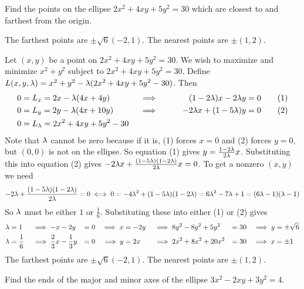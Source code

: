 \begin{question}[M200 2004A] %
Find the points on the ellipse $2x^2 + 4xy + 5y^2 = 30$ which are closest 
to and farthest from the origin.
\end{question}

%

\begin{answer}
The farthest points are $\pm\sqrt{6}(-2,1)$.
The nearest points are $\pm(1,2)$.
\end{answer}

\begin{solution}
Let $(x,y)$ be a point on $2x^2 + 4xy + 5y^2 = 30$. 
We wish to maximize and minimize $x^2+y^2$ subject to $2x^2 + 4xy + 5y^2 = 30$. 
Define $L(x,y,\lambda)=x^2+y^2-\lambda(2x^2 + 4xy + 5y^2 - 30)$. Then
\begin{alignat*}{5}
0&=L_x=2x-\lambda (4x+4y)\qquad&&\implies\qquad &(1-2\lambda)x-2\lambda y&=0\tag{1} \\
0&=L_y=2y-\lambda (4x+10y)\qquad&&\implies& -2\lambda x+(1-5\lambda)y&=0\tag{2} \\
0&=L_\lambda=2x^2 + 4xy + 5y^2 - 30
\end{alignat*}
 Note that
$\lambda$ cannot be zero because if it is, (1) forces $x=0$ and (2) forces
$y=0$, but $(0,0)$ is not on the ellipse. So equation (1) 
gives $y=\frac{1-2\lambda}{2\lambda}x$. Substituting this into
equation (2) gives $-2\lambda x+\frac{(1-5\lambda)(1-2\lambda)}{2\lambda}x=0$. To get a nonzero
$(x,y)$ we need 
\begin{equation*}
-2\lambda +\frac{(1-5\lambda)(1-2\lambda)}{2\lambda}=0\iff 0=-4\lambda^2+(1-5\lambda)(1-2\lambda)
=6\lambda^2-7\lambda+1=(6\lambda-1)(\lambda-1)
\end{equation*}
So $\lambda$ must be either $1$ or $\frac{1}{6}$. Substituting these into either (1) or (2) gives
\begin{alignat*}{7}
\lambda&=1&&\implies -x-2y&=0 
      &&\implies x&=-2y
      &&\implies 8y^2-8y^2+5y^2&=30
      &&\implies y&=\pm \sqrt{6}\\
\lambda&=\frac{1}{6}&&\implies \frac{2}{3} x-\frac{1}{3} y&=0 
                &&\implies y&=2x
                &&\implies 2x^2+8x^2+20x^2&=30
                &&\implies x&=\pm 1
\end{alignat*}
The farthest points are $\pm\sqrt{6}(-2,1)$.
The nearest points are $\pm(1,2)$.
\end{solution}

\begin{question}
Find the ends of the major and minor axes of the ellipse 
$3x^2-2xy+3y^2=4$.
\end{question}

